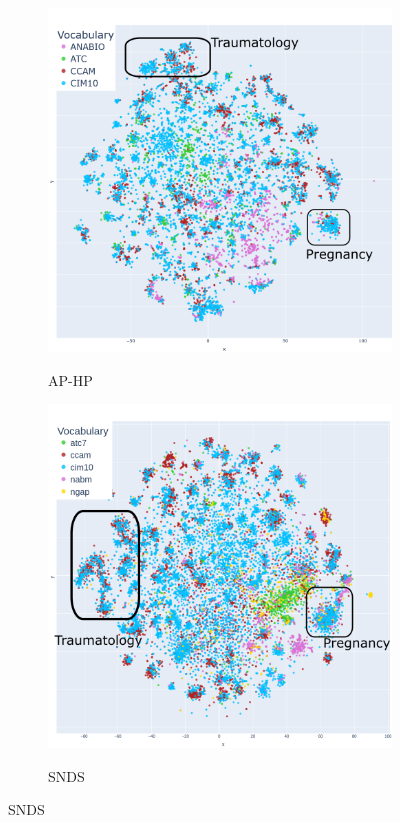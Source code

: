 \documentclass[french,12pt,twoside,a4paper]{book}
\begin{document}
\begin{appendices}
  \begin{figure}[h]
    \centering
    \begin{subfigure}[b]{0.48\linewidth}
      \centering
      \caption{AP-HP}
      \includegraphics[width=\linewidth]{img/chapter_3/aphp2vec_annotated.png}
      \label{fig:tsne_plots:aphp}
    \end{subfigure}
    \hfill
    \begin{subfigure}[b]{0.48\linewidth}
      \centering
      \caption{SNDS}
      \includegraphics[width=\linewidth]{img/chapter_3/snds2vec_annotated.png}
      \label{fig:tsne_plots:snds}
    \end{subfigure}


\end{figure}
\end{appendices}
\end{document}
